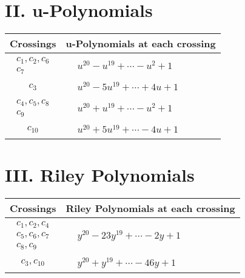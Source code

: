\documentclass[1p]{elsarticle_modified}
\theoremstyle{definition}
\begin{document}
\newpage\renewcommand{\arraystretch}{1}
\centering \section*{ II. u-Polynomials}
\begin{tabular}{m{50pt}|m{274pt}}
Crossings & \hspace{64pt}u-Polynomials at each crossing \\
\hline $$\begin{aligned}c_{1},c_{2},c_{6}\\c_{7}\end{aligned}$$&$\begin{aligned}
&u^{20}- u^{19}+\cdots- u^2+1
\end{aligned}$\\
\hline $$\begin{aligned}c_{3}\end{aligned}$$&$\begin{aligned}
&u^{20}-5 u^{19}+\cdots+4 u+1
\end{aligned}$\\
\hline $$\begin{aligned}c_{4},c_{5},c_{8}\\c_{9}\end{aligned}$$&$\begin{aligned}
&u^{20}+u^{19}+\cdots- u^2+1
\end{aligned}$\\
\hline $$\begin{aligned}c_{10}\end{aligned}$$&$\begin{aligned}
&u^{20}+5 u^{19}+\cdots-4 u+1
\end{aligned}$\\
\hline
\end{tabular}\newpage\renewcommand{\arraystretch}{1}
\centering \section*{ III. Riley Polynomials}
\begin{tabular}{m{50pt}|m{274pt}}
Crossings & \hspace{64pt}Riley Polynomials at each crossing \\
\hline $$\begin{aligned}c_{1},c_{2},c_{4}\\c_{5},c_{6},c_{7}\\c_{8},c_{9}\end{aligned}$$&$\begin{aligned}
&y^{20}-23 y^{19}+\cdots-2 y+1
\end{aligned}$\\
\hline $$\begin{aligned}c_{3},c_{10}\end{aligned}$$&$\begin{aligned}
&y^{20}+y^{19}+\cdots-46 y+1
\end{aligned}$\\
\hline
\end{tabular}
\vskip 2pc
\end{document}
